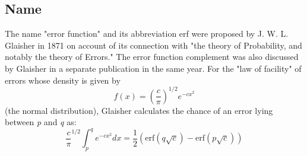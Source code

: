 \documentclass[12pt, a4paper, oneside]{article}
\begin{document}
\subsection*{Name}
The name "error function" and its abbreviation erf were proposed by J. W. L. Glaisher in 1871 on account of its connection with "the theory of Probability, and notably the theory of Errors." The error function complement was also discussed by Glaisher in a separate publication in the same year. For the "law of facility" of errors whose density is given by
\begin{equation}
f(x) = \left(\frac{c}{\pi}\right)^{1/2}e^{-cx^2}
\end{equation} 
(the normal distribution), Glaisher calculates the chance of an error lying between \textit{p} and \textit{q} as:
\begin{equation}
\frac{c}{\pi}^{1/2} \int_p ^q e^{-cx^2} dx = \frac{1}{2}\left(\mbox{erf}\left(q\sqrt{c}\right)-\mbox{erf}\left(p\sqrt{c}\right)\right)
\end{equation} 
\end{document}
